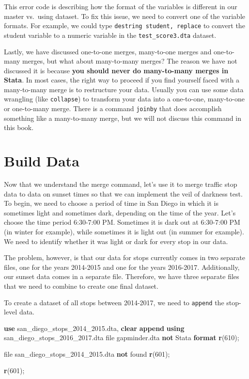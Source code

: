 \documentclass[
]{book}
\newenvironment{Shaded}{\begin{snugshade}}{\end{snugshade}}
\newcommand{\FunctionTok}[1]{\textcolor[rgb]{0.13,0.29,0.53}{\textbf{#1}}}
\newcommand{\KeywordTok}[1]{\textcolor[rgb]{0.13,0.29,0.53}{\textbf{#1}}}
\newcommand{\NormalTok}[1]{#1}
\begin{document}
This error code is describing how the format of the variables is different in our master vs.~using dataset. To fix this issue, we need to convert one of the variable formats. For example, we could type \texttt{destring\ student,\ replace} to convert the student variable to a numeric variable in the \texttt{test\_score3.dta} dataset.

Lastly, we have discussed one-to-one merges, many-to-one merges and one-to-many merges, but what about many-to-many merges? The reason we have not discussed it is because \textbf{you should never do many-to-many merges in Stata}. In most cases, the right way to proceed if you find yourself faced with a many-to-many merge is to restructure your data. Usually you can use some data wrangling (like \texttt{collapse}) to transform your data into a one-to-one, many-to-one or one-to-many merge. There is a command \texttt{joinby} that does accomplish something like a many-to-many merge, but we will not discuss this command in this book.

\section{Build Data}\label{build-data}

Now that we understand the merge command, let's use it to merge traffic stop data to data on sunset times so that we can implement the veil of darkness test. To begin, we need to choose a period of time in San Diego in which it is sometimes light and sometimes dark, depending on the time of the year. Let's choose the time period 6:30-7:00 PM. Sometimes it is dark out at 6:30-7:00 PM (in winter for example), while sometimes it is light out (in summer for example). We need to identify whether it was light or dark for every stop in our data.

The problem, however, is that our data for stops currently comes in two separate files, one for the years 2014-2015 and one for the years 2016-2017. Additionally, our sunset data comes in a separate file. Therefore, we have three separate files that we need to combine to create one final dataset.

To create a dataset of all stops between 2014-2017, we need to \texttt{append} the stop-level data.

\begin{Shaded}
\begin{Highlighting}[]
\KeywordTok{use}\NormalTok{ san\_diego\_stops\_2014\_2015.dta, }\KeywordTok{clear}
\KeywordTok{append} \KeywordTok{using}\NormalTok{ san\_diego\_stops\_2016\_2017.dta}
\NormalTok{file gapminder.dta }\KeywordTok{not}\NormalTok{ Stata }\KeywordTok{format}
\FunctionTok{r}\NormalTok{(610);}


\NormalTok{file san\_diego\_stops\_2014\_2015.dta }\KeywordTok{not}\NormalTok{ found}
\FunctionTok{r}\NormalTok{(601);}

\FunctionTok{r}\NormalTok{(601);}
\end{Highlighting}
\end{Shaded}
\end{document}
